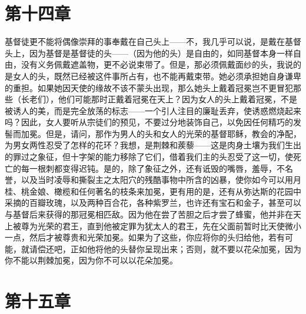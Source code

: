 
\section{第十四章}

基督徒更不能将偶像崇拜的事奉戴在自己头上——不，我几乎可以说，是戴在基督头上，因为基督是基督徒的头——（因为他的头）是自由的，如同基督本身一样自由，没有义务佩戴遮盖物，更不必说束带了。但是，那必须佩戴面纱的头，我说的是女人的头，既然已经被这件事所占有，也不能再戴束带。她必须承担她自身谦卑的重担。如果她因天使的缘故不该不蒙头出现，那么她头上戴着冠冕岂不更冒犯那些（长老们），他们可能那时正戴着冠冕在天上？因为女人的头上戴着冠冕，不是被诱人的美，而是完全放荡的标志——一个引人注目的廉耻丢弃，使诱惑燃烧起来吗？因此，女人要听从宗徒们的预见，不要过分地装饰自己，以免因任何精巧的发髻而加冕。但是，请问，那作为男人的头和女人的光荣的基督耶稣，教会的净配，为男女两性忍受了怎样的花环？我想，是荆棘和蒺藜——这是肉身土壤为我们生出的罪过之象征，但十字架的能力移除了它们，借着我们主的头忍受了这一切，使死亡的每一根刺都变得迟钝。是的，除了象征之外，还有诋毁的嘴唇，羞辱，不名誉，以及当时凌辱和撕裂主之太阳穴的残酷事物中所含的凶暴，使你如今可以用月桂、桃金娘、橄榄和任何著名的枝条来加冕，更有用的是，还有从弥达斯的花园中采摘的百瓣玫瑰，以及两种百合花，各种紫罗兰，也许还有宝石和金子，甚至可以与基督后来获得的那冠冕相匹敌。因为他在尝了苦胆之后才尝了蜂蜜，他并非在天上被尊为光荣的君王，直到他被定罪为犹太人的君王，先在父面前暂时比天使微小一点，然后才被尊贵和光荣加冕。如果为了这些，你应将你的头归给他，若有可能，就请偿还吧，正如他将他的头替你呈现出来；否则，就不要以花朵加冕，因为你不能以荆棘加冕，因为你不可以以花朵加冕。\par


\section{第十五章}


